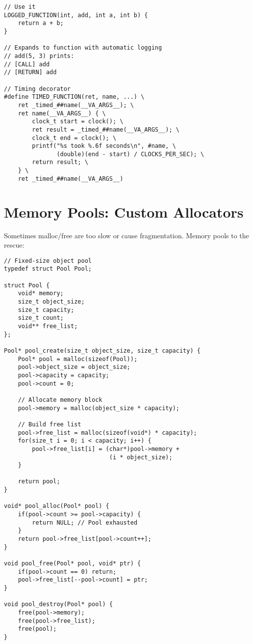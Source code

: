 \begin{description}[style=nextline,leftmargin=0pt]
\begin{lstlisting}
// Use it
LOGGED_FUNCTION(int, add, int a, int b) {
    return a + b;
}

// Expands to function with automatic logging
// add(5, 3) prints:
// [CALL] add
// [RETURN] add

// Timing decorator
#define TIMED_FUNCTION(ret, name, ...) \
    ret _timed_##name(__VA_ARGS__); \
    ret name(__VA_ARGS__) { \
        clock_t start = clock(); \
        ret result = _timed_##name(__VA_ARGS__); \
        clock_t end = clock(); \
        printf("%s took %.6f seconds\n", #name, \
               (double)(end - start) / CLOCKS_PER_SEC); \
        return result; \
    } \
    ret _timed_##name(__VA_ARGS__)
\end{lstlisting}

\section{Memory Pools: Custom Allocators}

Sometimes malloc/free are too slow or cause fragmentation. Memory pools to the rescue:

\begin{lstlisting}
// Fixed-size object pool
typedef struct Pool Pool;

struct Pool {
    void* memory;
    size_t object_size;
    size_t capacity;
    size_t count;
    void** free_list;
};

Pool* pool_create(size_t object_size, size_t capacity) {
    Pool* pool = malloc(sizeof(Pool));
    pool->object_size = object_size;
    pool->capacity = capacity;
    pool->count = 0;

    // Allocate memory block
    pool->memory = malloc(object_size * capacity);

    // Build free list
    pool->free_list = malloc(sizeof(void*) * capacity);
    for(size_t i = 0; i < capacity; i++) {
        pool->free_list[i] = (char*)pool->memory +
                              (i * object_size);
    }

    return pool;
}

void* pool_alloc(Pool* pool) {
    if(pool->count >= pool->capacity) {
        return NULL; // Pool exhausted
    }
    return pool->free_list[pool->count++];
}

void pool_free(Pool* pool, void* ptr) {
    if(pool->count == 0) return;
    pool->free_list[--pool->count] = ptr;
}

void pool_destroy(Pool* pool) {
    free(pool->memory);
    free(pool->free_list);
    free(pool);
}


\end{lstlisting}
\end{description}
